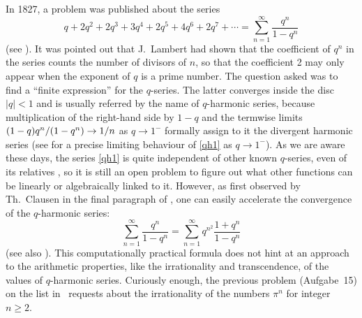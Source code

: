 \documentclass[12pt,reqno]{amsart}
\theoremstyle{remark}
\begin{document}
In 1827, a problem was published about the series
\begin{equation}
q+2q^2+2q^3+3q^4+2q^5+4q^6+2q^7+\dotsb=\sum_{n=1}^\infty\frac{q^n}{1-q^n}
\label{qh1}
\end{equation}
(see \cite[Aufgabe 16, p.~99]{Cr27}). It was pointed out that J.~Lambert had shown that the coefficient of $q^n$ in the series
counts the number of divisors of $n$, so that the coefficient 2 may only appear when the exponent of $q$ is a prime number.
The question asked was to find a ``finite expression'' for the $q$-series. The latter converges inside the disc $|q|<1$ and
is usually referred by the name of $q$-harmonic series, because multiplication of the right-hand side by $1-q$ and the termwise limits
$(1-\nobreak q)\*q^n/(1-q^n)\to1/n$ as $q\to1^-$ formally assign to it the divergent harmonic series
(see \cite[Division~2, Problem~32]{PS78} for a precise limiting behaviour of \eqref{qh1} as $q\to1^-$).
As we are aware these days, the series \eqref{qh1} is quite independent of other known $q$-series, even of its relatives \cite{Pu05},
so it is still an open problem to figure out what other functions can be linearly or algebraically linked to it.
However, as first observed by Th.~Clausen in the final paragraph of \cite{Cl28}, one can easily accelerate the convergence of the $q$-harmonic series:
\begin{equation*}
\sum_{n=1}^\infty\frac{q^n}{1-q^n}
=\sum_{n=1}^\infty q^{n^2}\frac{1+q^n}{1-q^n}
\end{equation*}
(see also \cite[Division~8, Problem~74]{PS76}). This computationally practical formula does not hint at an approach to the arithmetic properties,
like the irrationality and transcendence, of the values of $q$-harmonic series.
Curiously enough, the previous problem (Aufgabe~15) on the list in~\cite{Cr27} requests about the irrationality of the numbers $\pi^n$ for integer $n\ge2$.
\end{document}
